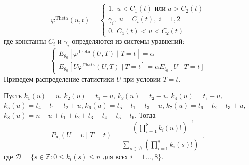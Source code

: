     $$
    \varphi^{\text{Theta}}(u,t)=\begin{cases}
        1, \; u<C_1(t) \text{ или } u>C_2(t)\\
        \gamma_i, \; u=C_i(t), \; i=1,2\\
        0, \; C_1(t)<u<C_2(t)
    \end{cases}
    $$
    где константы $C_i$ и $\gamma_i$ определяются из системы уравнений:
    $$
    \begin{cases}
        E_{\theta_0}[\varphi^{\text{Theta}}(U,T) \mid T=t]=\alpha \\
        E_{\theta_0}[U\varphi^{\text{Theta}}(U,T) \mid T=t]=\alpha E_{\theta_0}[U \mid T=t]
    \end{cases}
    $$
    Приведем распределение статистики $U$ при условии $T=t$.      
    \begin{lemma}\label{u_dist}
        Пусть $k_1(u)=u$, $k_2(u)=t_1-u$, $k_3(u)=t_2-u$, $k_4(u)=t_3-u$, $k_5(u)=t_4-t_1-t_2+u$, $k_6(u)=t_5-t_1-t_3+u$,
        $k_7(u)=t_6 - t_2 - t_3 + u$, $k_8(u)=n-u+t_1+t_2+t_3-t_4-t_5-t_6$.
        Тогда
        $$P_{\theta_0}(U=u \mid T=t)=\dfrac{(\prod_{i=1}^8 k_i(u)!)^{-1}}
            {\sum_{s\in \mathcal{D}} (\prod_{i=1}^8 k_i(s)!)^{-1}}$$
        где $\mathcal{D}=\{s \in \mathbb{Z}: 0\leq k_i(s) \leq n \text{ для всех } i=1\ldots,8\}$.
    \end{lemma}

